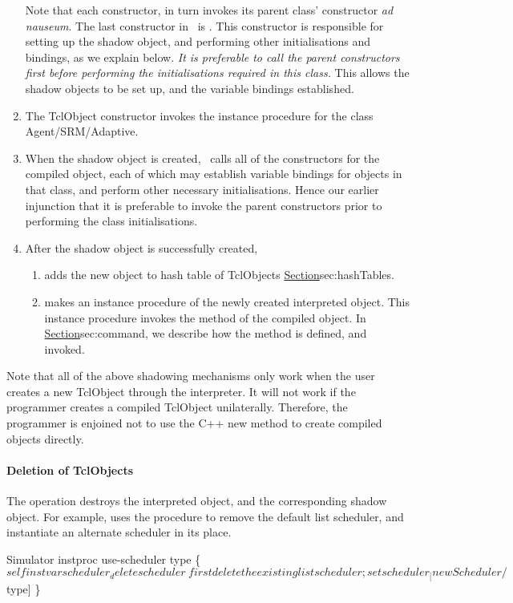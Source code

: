 \begin{enumerate}
  Note that each constructor,
  in turn invokes its parent class' constructor \textit{ad nauseum}.
  The last constructor in \ns\ is
  .
  This constructor is responsible for setting up the shadow object, and 
  performing other initialisations and bindings, as we explain below.
  \emph{It is preferable to call the parent constructors first before
    performing the initialisations required in this class.}
  This allows the shadow objects to be set up,
  and the variable bindings established.
\item The TclObject constructor invokes the instance procedure
   for the class Agent/SRM/Adaptive.
\item When the shadow object is created,
  \ns\ calls all of the constructors for the compiled object,
  each of which may establish variable bindings for objects in that class,
  and perform other necessary initialisations.
  Hence our earlier injunction that it is preferable to invoke the parent
  constructors prior to performing the class initialisations.
\item After the shadow object is successfully created,
  \begin{enumerate}
  \item adds the new object to hash table of TclObjects
        \href{described earlier}{Section}{sec:hashTables}.
  \item makes  an instance procedure of the newly created
    interpreted object.
    This instance procedure
    invokes the  method of the compiled object.
    In \href{a later subsection}{Section}{sec:command},
    we describe how the  method is defined, and invoked.
  \end{enumerate}
\end{enumerate}
Note that all of the above shadowing mechanisms only work when
the user creates a new TclObject through the interpreter.
It will not work if the programmer creates a compiled TclObject unilaterally.
Therefore, the programmer is enjoined not to use the C++ new method
to create compiled objects directly.

\paragraph{Deletion of TclObjects}
The  operation
destroys the interpreted object, and the corresponding shadow object.
For example,
uses the  procedure to remove the default list scheduler,
and instantiate an alternate scheduler in its place.
\begin{program}
        Simulator instproc use-scheduler type \{
                $self instvar scheduler_

                delete scheduler_ \; first delete the existing list scheduler;
                set scheduler_ [new Scheduler/$type]
        \}
\end{program}

